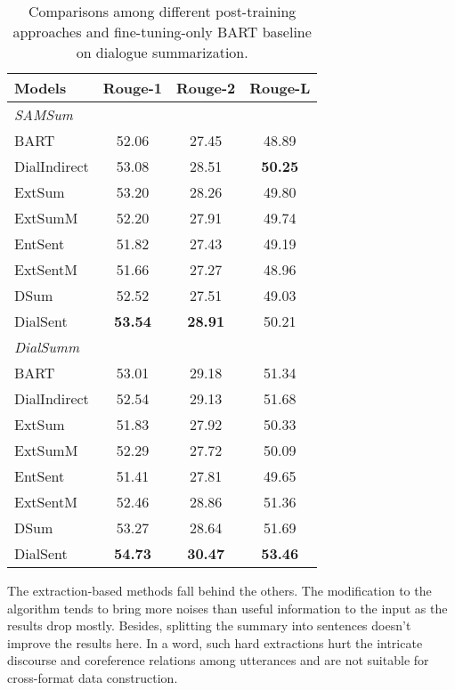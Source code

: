 \begin{table}[h!]
	\small
	\centering
	\begin{tabular}{lccc}
		\toprule[1pt]
		\textbf{Models} & \textbf{Rouge-1} & \textbf{Rouge-2} & \textbf{Rouge-L} \\
		\midrule[1pt]
		\multicolumn{4}{l}{\textit{SAMSum}} \\
		{BART} &52.06 &27.45 &48.89 \\
		{DialIndirect} &  53.08&28.51  & \textbf{50.25} \\
		{ExtSum} &  53.20& 28.26 & 49.80 \\
		{ExtSumM} & 52.20 & 27.91 & 49.74   \\
		{EntSent} & 51.82 & 27.43 & 49.19   \\
		{ExtSentM} & 51.66 & 27.27 &  48.96  \\
		{DSum} & 52.52&27.51 &49.03 \\
		{DialSent} & \textbf{53.54} & \textbf{28.91} &  50.21 \\
		
		\midrule[1pt]
		
		\multicolumn{4}{l}{\textit{DialSumm}} \\
		{BART} & 53.01&29.18 &51.34 \\
		{DialIndirect} &  52.54&29.13  &51.68 \\
		{ExtSum} & 51.83 & 27.92 &50.33  \\
		{ExtSumM} & 52.29 & 27.72 & 50.09   \\
		{EntSent} & 51.41 & 27.81 & 49.65   \\
		{ExtSentM} & 52.46 & 28.86 & 51.36 \\
		{DSum} & 53.27 & 28.64 & 51.69 \\
		{DialSent} &\textbf{54.73} & \textbf{30.47}&  \textbf{53.46}  \\
		\bottomrule[1pt]
	\end{tabular}
	\caption{Comparisons among different post-training approaches and fine-tuning-only BART baseline on dialogue summarization.}
	\label{tab:rephrasing}
\end{table}


The extraction-based methods fall behind the others. The modification to the algorithm tends to bring more noises than useful information to the input as the results drop mostly. 
Besides, splitting the summary into sentences doesn't improve the results here.
In a word, such hard extractions hurt the intricate discourse and coreference relations among utterances and are not suitable for cross-format data construction.

